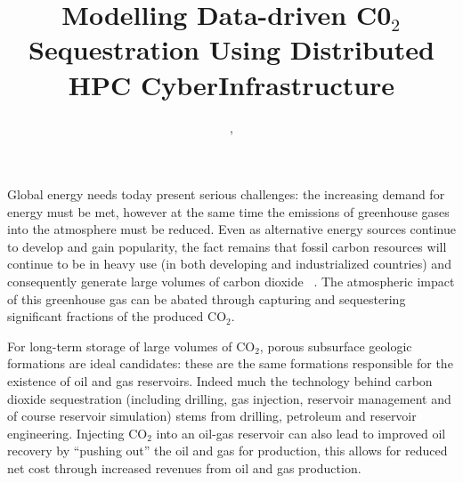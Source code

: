 \documentclass[conference,final]{IEEEtran}
\begin{document}
\title{Modelling Data-driven C0$_{2}$ Sequestration Using Distributed HPC CyberInfrastructure}

 \author{,
    }


\maketitle



Global energy needs today present serious challenges: the increasing demand for energy must be met, however at the same time the 
emissions of greenhouse gases into the atmosphere must be reduced. Even as alternative energy sources continue to develop and gain 
popularity, the fact remains that fossil carbon resources will continue to be in heavy use (in both developing and industrialized 
countries) and consequently generate large volumes of carbon dioxide ~\cite{GeoRPT}. The atmospheric impact of this greenhouse gas 
can be abated through capturing and sequestering significant fractions of the produced CO$_2$.

For long-term storage of large volumes of CO$_2$, porous subsurface geologic formations are ideal candidates: these are the same 
formations responsible for the existence of oil and gas reservoirs. Indeed much the technology behind carbon dioxide sequestration 
(including drilling, gas injection, reservoir management and of course reservoir simulation) stems from drilling, petroleum and 
reservoir engineering. Injecting CO$_2$ into an oil-gas reservoir can also lead to improved oil recovery by ``pushing out'' the 
oil and gas for production, this allows for reduced net cost through increased revenues from oil and gas production. 
~\cite{EORBook}
\end{document}
